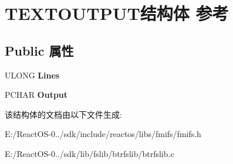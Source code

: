 \hypertarget{struct_t_e_x_t_o_u_t_p_u_t}{}\section{T\+E\+X\+T\+O\+U\+T\+P\+U\+T结构体 参考}
\label{struct_t_e_x_t_o_u_t_p_u_t}
\subsection*{Public 属性}
\begin{DoxyCompactItemize}
\item 
\mbox{\label{struct_t_e_x_t_o_u_t_p_u_t_a136590cbb0f28d11248192a76911b919}} 
U\+L\+O\+NG {\bfseries Lines}
\item 
\mbox{\label{struct_t_e_x_t_o_u_t_p_u_t_a4a2973aae3a7df86cb9af8d8ac87834c}} 
P\+C\+H\+AR {\bfseries Output}
\end{DoxyCompactItemize}


该结构体的文档由以下文件生成\+:\begin{DoxyCompactItemize}
\item 
E\+:/\+React\+O\+S-\/0../sdk/include/reactos/libs/fmifs/fmifs.\+h\item 
E\+:/\+React\+O\+S-\/0../sdk/lib/fslib/btrfslib/btrfslib.\+c\end{DoxyCompactItemize}
